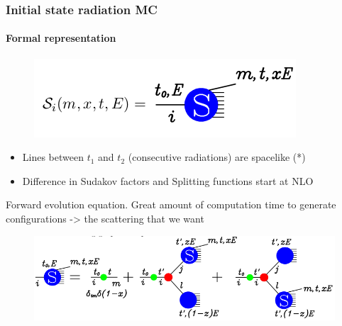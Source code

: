 \documentclass[aspectratio=43]{beamer}
\begin{document}
\begin{frame}
	
	\frametitle{Initial state radiation MC}
	\framesubtitle{Formal representation}
	
	\begin{figure}
		\includegraphics[width = 3 cm]{plots/shower_ISR_2.png}
	\end{figure}
	
	\begin{itemize} 
		\item Lines between $t_{1}$ and $t_{2}$ (consecutive radiations) are spacelike {\color{blue}(*)}
		\item Difference in Sudakov factors and Splitting functions start at NLO
	\end{itemize}
	
	Forward evolution equation. Great amount of computation time to generate configurations -> the scattering that we want
	\begin{figure}
		\includegraphics[width = 10 cm]{plots/shower_ISR_3.png}
	\end{figure}

\end{frame}
\end{document}

